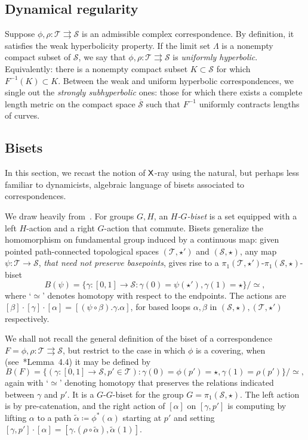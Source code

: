 \documentclass{amsart}
\theoremstyle{definition}
\theoremstyle{remark}
\newcommand{\sfX}{{\sf X}}
\newcommand{\cT}{\mathcal{T}}
\newcommand{\cS}{\mathcal{S}}
\begin{document}
\subsection{Dynamical regularity} 
Suppose $\phi, \rho\colon \cT \rightrightarrows\cS$ is an admissible complex correspondence. By definition, it satisfies the weak hyperbolicity property.  If the limit set $\Lambda$ is a nonempty compact subset of $\cS$, we say that $\phi, \rho\colon \cT \rightrightarrows\cS$ is \emph{uniformly hyperbolic}.  Equivalently: there is a nonempty compact subset $K \subset \cS$ for which $F^{-1}(K) \subset K$. Between the weak and uniform hyperbolic correspondences, we single out the \emph{strongly subhyperbolic} ones: those for which there exists a complete length metric on the compact space $\overline{\cS}$ such that $F^{-1}$ uniformly contracts lengths of curves. 

\subsection{Bisets}\label{subsecn:introbisets}
In this section, we recast the notion of $\sfX$-ray using the natural, but perhaps less familiar to dynamicists, algebraic language of bisets associated to correspondences.

We draw heavily from~\cite{MR3781419}. For groups $G,H$, an \emph{$H$-$G$-biset} is a set equipped with a left $H$-action and a right $G$-action that commute.  Bisets generalize the homomorphism on fundamental group induced by a continuous map: given pointed path-connected topological spaces $(\cT,\star')$ and $(\cS,\star)$, any map $\psi\colon \cT\to\cS$, \emph{that need not preserve basepoints}, gives rise to a $\pi_1(\cT,\star')$-$\pi_1(\cS,\star)$-biset
\[B(\psi)=\{\gamma\colon[0,1]\to\cS:\gamma(0)=\psi(\star'),\gamma(1)=\star\}/{\simeq},\]
where `$\simeq$' denotes homotopy with respect to the endpoints. The actions are $[\beta]\cdot[\gamma]\cdot[\alpha]=[(\psi\circ\beta).\gamma.\alpha]$, for based loops $\alpha,\beta$ in $(\cS,\star),(\cT,\star')$ respectively.

We shall not recall the general definition of the biset of a correspondence $F=\phi,\rho:\cT\rightrightarrows\cS$, but restrict to the case in which $\phi$ is a covering, when (see~\cite{MR3781419}*{Lemma~4.4}) it may be defined by
\[B(F)=\{(\gamma\colon[0,1]\to\cS,p'\in \cT):\gamma(0)=\phi(p')=\star,\gamma(1)=\rho(p')\}/{\simeq},\]
again with `$\simeq$' denoting homotopy that preserves the relations indicated between $\gamma$ and $p'$. It is a $G$-$G$-biset for the group $G=\pi_1(\cS,\star)$. The left action is by pre-catenation, and the right action of $[\alpha]$ on $[\gamma,p']$ is computing by lifting $\alpha$ to a path $\widetilde\alpha\coloneqq\phi^*(\alpha)$ starting at $p'$ and setting $[\gamma,p']\cdot[\alpha]=[\gamma.(\rho\circ\widetilde\alpha),\widetilde\alpha(1)]$.
\end{document}
